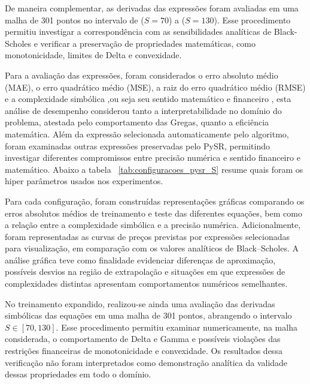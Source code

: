 De maneira complementar, as derivadas das expressões foram avaliadas em uma malha de 301 pontos no intervalo de ($S=70$) a ($S=130$). Esse procedimento permitiu investigar a correspondência com as sensibilidades analíticas de Black-Scholes e verificar a preservação de propriedades matemáticas, como monotonicidade, limites de Delta e convexidade.

Para a avaliação das expressões, foram considerados o erro absoluto médio (MAE), o erro quadrático médio (MSE), a raiz do erro quadrático médio (RMSE) e a complexidade simbólica ,ou seja seu sentido matemático e financeiro , esta análise de desempenho considerou tanto a interpretabilidade no domínio do problema, atestada pelo comportamento das Gregas, quanto a eficiência matemática. Além da expressão selecionada automaticamente pelo algoritmo, foram examinadas outras expressões preservadas pelo PySR, permitindo investigar diferentes compromissos entre precisão numérica e sentido financeiro e matemático. Abaixo a tabela ~\ref{tab:configuracoes_pysr_S} resume quais foram os hiper parâmetros usados nos experimentos.

Para cada configuração, foram construídas representações gráficas comparando os erros absolutos médios de treinamento e teste das diferentes equações, bem como a relação entre a complexidade simbólica e a precisão numérica. Adicionalmente, foram representadas as curvas de preços previstas por expressões selecionadas para visualização, em comparação com os valores analíticos de Black--Scholes. A análise gráfica teve como finalidade evidenciar diferenças de aproximação, possíveis desvios na região de extrapolação e situações em que expressões de complexidades distintas apresentam comportamentos numéricos semelhantes.

No treinamento expandido, realizou-se ainda uma avaliação das derivadas simbólicas das equações em uma malha de 301 pontos, abrangendo o intervalo $S\in[70,130]$. Esse procedimento permitiu examinar numericamente, na malha considerada, o comportamento de Delta e Gamma e possíveis violações das restrições financeiras de monotonicidade e convexidade. Os resultados dessa verificação não foram interpretados como demonstração analítica da validade dessas propriedades em todo o domínio.


